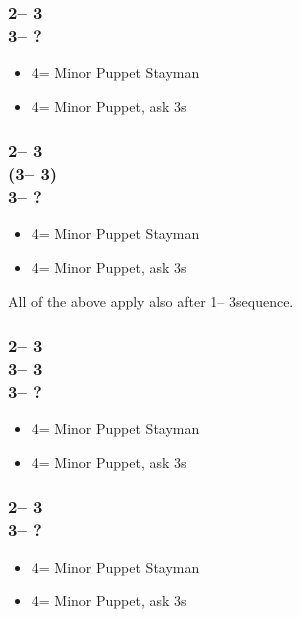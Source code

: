 \documentclass[12pt, a4paper]{report}
\begin{document}
{{{            \subsubsection*{2\nt -- 3\clubs\\
                            3\major -- ?}
            \begin{itemize}
                \item 4\clubs = Minor Puppet Stayman
                \item 4\diams = Minor Puppet, ask 3s
            \end{itemize}

            \subsubsection*{2\nt -- 3\clubs\\
                            (3\diams -- 3\major)\\
                            3\nt -- ?}
            \begin{itemize}
                \item 4\clubs = Minor Puppet Stayman
                \item 4\diams = Minor Puppet, ask 3s
            \end{itemize}

            All of the above apply also after 1\nt -- 3\clubs sequence.

            \subsubsection*{2\nt -- 3\diams\\
                            3\hearts -- 3\spades\\
                            3\nt -- ?}
            \begin{itemize}
                \item 4\clubs = Minor Puppet Stayman
                \item 4\diams = Minor Puppet, ask 3s
            \end{itemize}

            \subsubsection*{2\nt -- 3\hearts\\
                            3\spades -- ?}
            \begin{itemize}
                \item 4\clubs = Minor Puppet Stayman
                \item 4\diams = Minor Puppet, ask 3s
            \end{itemize}

}}}
\end{document}
